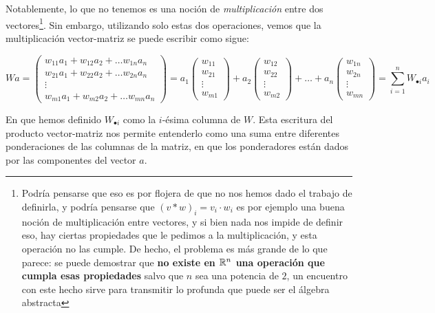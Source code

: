 Notablemente, lo que no tenemos es una noción de \textit{multiplicación} entre dos vectores\footnote{Podría pensarse que eso es por flojera de que no nos hemos dado el trabajo de definirla, y podría pensarse que $(v * w)_i = v_i \cdot w_i$ es por ejemplo una buena noción de multiplicación entre vectores, y si bien nada nos impide de definir eso, hay ciertas propiedades que le pedimos a la multiplicación, y esta operación no las cumple. De hecho, el problema es más grande de lo que parece: se puede demostrar que \textbf{no existe en $\mathbb{R}^n$ una operación que cumpla esas propiedades} salvo que $n$ sea una potencia de $2$, un encuentro con este hecho sirve para transmitir lo profunda que puede ser el álgebra abstracta}. Sin embargo, utilizando solo estas dos operaciones, vemos que la multiplicación vector-matriz se puede escribir como sigue:

\[Wa = \begin{pmatrix}
    w_{11} a_1 + w_{12} a_2 + \dots w_{1n} a_n\\
    w_{21} a_1 + w_{22} a_2 + \dots w_{2n} a_n\\
    \vdots \\
    w_{m1} a_1 + w_{m2} a_2 + \dots w_{mn} a_n
\end{pmatrix} = a_1 \begin{pmatrix}
    w_{11} \\ w_{21} \\ \vdots \\ w_{m1}
\end{pmatrix} + a_2 \begin{pmatrix}
    w_{12} \\ w_{22} \\ \vdots \\ w_{m2}
\end{pmatrix} + \dots + a_n \begin{pmatrix}
    w_{1n} \\ w_{2n} \\ \vdots \\ w_{mn}
\end{pmatrix} = \sum_{i = 1}^n W_{\bullet i} a_i \]

En que hemos definido $W_{\bullet i}$ como la $i$-ésima columna de $W$. Esta escritura del producto vector-matriz nos permite entenderlo como una suma entre diferentes ponderaciones de las columnas de la matriz, en que los ponderadores están dados por las componentes del vector $a$.

